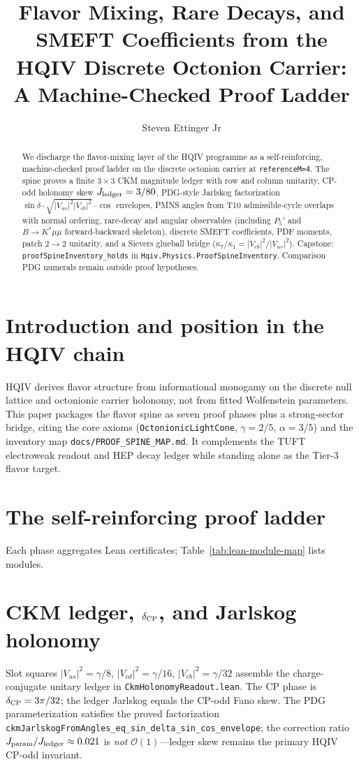 \documentclass[11pt]{amsart}
\title{Flavor Mixing, Rare Decays, and SMEFT Coefficients from the HQIV Discrete Octonion Carrier: A Machine-Checked Proof Ladder}
\author{Steven Ettinger Jr}
\begin{document}
\maketitle

\begin{abstract}
We discharge the flavor-mixing layer of the HQIV programme as a self-reinforcing,
machine-checked proof ladder on the discrete octonion carrier at \texttt{referenceM=4}.
The spine proves a finite $3\times3$ CKM magnitude ledger with row and column unitarity,
CP-odd holonomy skew $J_{\rm ledger}=3/80$, PDG-style Jarlskog factorization
$\sin\delta\cdot\sqrt{|V_{us}|^2|V_{cb}|^2}\cdot\cos$ envelopes, PMNS angles from T10
admissible-cycle overlaps with normal ordering, rare-decay and angular observables
(including $P_5'$ and $B\to K^*\mu\mu$ forward-backward skeleton), discrete SMEFT
coefficients, PDF moments, patch 2$\to$2 unitarity, and a Sievers glueball bridge
($\kappa_7/\kappa_1=|V_{cb}|^2/|V_{us}|^2$).
Capstone: \texttt{proofSpineInventory\_holds} in \texttt{Hqiv.Physics.ProofSpineInventory}.
Comparison PDG numerals remain outside proof hypotheses.
\end{abstract}

\section{Introduction and position in the HQIV chain}
HQIV derives flavor structure from informational monogamy on the discrete null lattice
and octonionic carrier holonomy, not from fitted Wolfenstein parameters.
This paper packages the flavor spine as seven proof phases plus a strong-sector bridge,
citing the core axioms (\texttt{OctonionicLightCone}, $\gamma=2/5$, $\alpha=3/5$) and
the inventory map \texttt{docs/PROOF\_SPINE\_MAP.md}.
It complements the TUFT electroweak readout and HEP decay ledger while standing alone
as the Tier-3 flavor target.

\section{The self-reinforcing proof ladder}
Each phase aggregates Lean certificates; Table~\ref{tab:lean-module-map} lists modules.


\section{CKM ledger, $\delta_{\rm CP}$, and Jarlskog holonomy}
Slot squares $|V_{us}|^2=\gamma/8$, $|V_{cd}|^2=\gamma/16$, $|V_{cb}|^2=\gamma/32$
assemble the charge-conjugate unitary ledger in \texttt{CkmHolonomyReadout.lean}.
The CP phase is $\delta_{\rm CP}=3\pi/32$; the ledger Jarlskog equals the CP-odd Fano skew.
The PDG parameterization satisfies the proved factorization
\texttt{ckmJarlskogFromAngles\_eq\_sin\_delta\_sin\_cos\_envelope}; the correction ratio
$J_{\rm param}/J_{\rm ledger}\approx 0.021$ is \emph{not} $\mathcal{O}(1)$---ledger skew
remains the primary HQIV CP-odd invariant.

\end{document}

